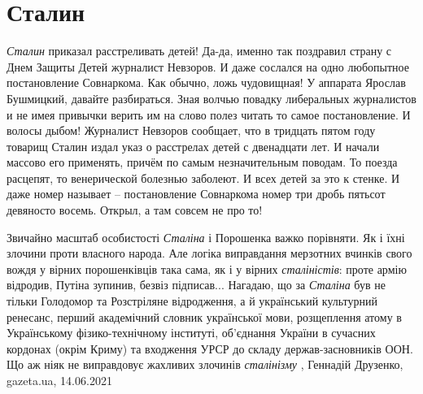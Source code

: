  
 
 
 
 
\chapter{Сталин}
\label{sec:slova.stalin}

\emph{Сталин} приказал расстреливать детей! Да-да, именно так поздравил страну с Днем
Защиты Детей журналист Невзоров. И даже сослался на одно любопытное
постановление Совнаркома. Как обычно, ложь чудовищная!  У аппарата Ярослав
Бушмицкий, давайте разбираться. Зная волчью повадку либеральных журналистов и
не имея привычки верить им на слово полез читать то самое постановление. И
волосы дыбом!  Журналист Невзоров сообщает, что в тридцать пятом году товарищ
Сталин издал указ о расстрелах детей с двенадцати лет. И начали массово его
применять, причём по самым незначительным поводам. То поезда расцепят, то
венерической болезнью заболеют. И всех детей за это к стенке. И даже номер
называет – постановление Совнаркома номер три дробь пятьсот девяносто восемь.
Открыл, а там совсем не про то!

Звичайно масштаб особистості \emph{Сталіна} і Порошенка важко порівняти. Як і їхні
злочини проти власного народа. Але логіка виправдання мерзотних вчинків свого
вождя у вірних порошенківців така сама, як і у вірних \emph{сталіністів}: проте армію
відродив, Путіна зупинив, безвіз підписав... Нагадаю, що за \emph{Сталіна} був не
тільки Голодомор та Розстріляне відродження, а й український культурний
ренесанс, перший академічний словник української мови, розщеплення атому в
Українському фізико-технічному інституті, об'єднання України в сучасних
кордонах (окрім Криму) та входження УРСР до складу держав-засновників ООН. Що
аж ніяк не виправдовує жахливих злочинів \emph{сталінізму}
, 
Геннадій Друзенко, gazeta.ua, 14.06.2021
